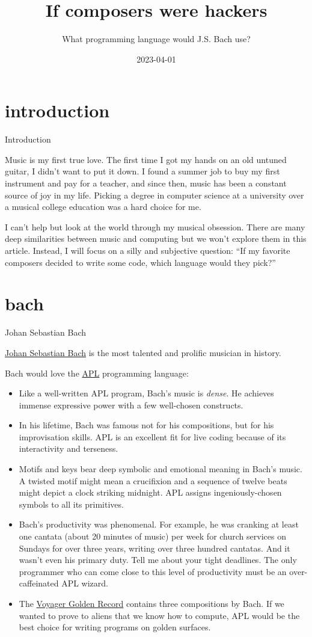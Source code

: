 \documentclass{article}
\title{If composers were hackers}
\subtitle{What programming language would J.S. Bach use?}
\date{2023-04-01}
\begin{document}
\section{introduction}{Introduction}

Music is my first true love.
The first time I got my hands on an old untuned guitar, I didn't want to put it down.
I found a summer job to buy my first instrument and pay for a teacher, and since then, music has been a constant source of joy in my life.
Picking a degree in computer science at a university over a musical college education was a hard choice for me.

I can't help but look at the world through my musical obsession.
There are many deep similarities between music and computing but we won't explore them in this article.
Instead, I will focus on a silly and subjective question: ``If my favorite composers decided to write some code, which language would they pick?''

\section{bach}{Johan Sebastian Bach}

\href{https://en.wikipedia.org/wiki/Johann_Sebastian_Bach}{Johan Sebastian Bach} is the most talented and prolific musician in history.

Bach would love the \href{https://en.wikipedia.org/wiki/APL_(programming_language)}{APL} programming language:

\begin{itemize}
  \item
    Like a well-written APL program, Bach's music is \emph{dense}.
    He achieves immense expressive power with a few well-chosen constructs.
  \item
    In his lifetime, Bach was famous not for his compositions, but for his improvisation skills.
    APL is an excellent fit for live coding because of its interactivity and terseness.
  \item
    Motifs and keys bear deep symbolic and emotional meaning in Bach's music.
    A twisted motif might mean a crucifixion and a sequence of twelve beats might depict a clock striking midnight.
    APL assigns ingeniously-chosen symbols to all its primitives.
  \item
    Bach's productivity was phenomenal.
    For example, he was cranking at least one cantata (about 20 minutes of music) per week for church services on Sundays for over three years, writing over three hundred cantatas.
    And it wasn't even his primary duty.
    Tell me about your tight deadlines.
    The only programmer who can come close to this level of productivity must be an over-caffeinated APL wizard.
  \item
    The \href{https://en.wikipedia.org/wiki/Contents_of_the_Voyager_Golden_Record}{Voyager Golden Record} contains three compositions by Bach.
    If we wanted to prove to aliens that we know how to compute, APL would be the best choice for writing programs on golden surfaces.
\end{itemize}
\end{document}
